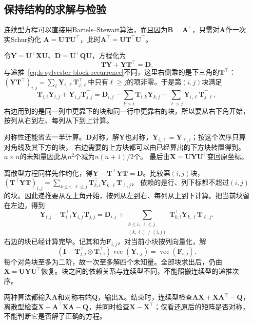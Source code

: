 \subsection{保持结构的求解与检验}
\label{sec:ls-lyapunov-solve}

连续型方程可以直接用Bartels--Stewart算法，而且因为$\bm B=\bm A^\top$，只需对$\bm A$作一次实Schur约化
$\bm A=\bm U\bm T\bm U^\top$，此时$\bm A^\top=\bm U\bm T^\top\bm U^\top$。

令$\bm Y=\bm U^\top\bm X\bm U$、$\bm D=\bm U^\top\bm Q\bm U$，方程化为
\[
 \bm T\bm Y+\bm Y\bm T^\top=\bm D .
\]
与递推~\eqref{eq:ls-sylvester-block-recurrence}不同，这里右侧乘的是下三角的$\bm T^\top$：
$(\bm Y\bm T^\top)_{i,j}=\sum_\ell\bm Y_{i,\ell}\bm T_{j,\ell}^\top$中只有$\ell\geq j$的项非零。于是第$(i,j)$块满足
\[
 \bm T_{i,i}\bm Y_{i,j}+\bm Y_{i,j}\bm T_{j,j}^\top
 =\bm D_{i,j}-\sum_{k>i}\bm T_{i,k}\bm Y_{k,j}-\sum_{\ell>j}\bm Y_{i,\ell}\bm T_{j,\ell}^\top ,
\]
右边用到的是同一列中更靠下的块和同一行中更靠右的块，所以要从右下角开始，按列从右到左、每列从下到上计算。

对称性还能省去一半计算。$\bm D$对称，解$\bm Y$也对称，$\bm Y_{i,\ell}=\bm Y_{\ell,i}^\top$；按这个次序只算对角线及其下方的块，
右边需要的上方块都可以由已经算出的下方块转置得到。$n\times n$的未知量因此从$n^2$个减为$n(n+1)/2$个。
最后由$\bm X=\bm U\bm Y\bm U^\top$变回原坐标。

离散型方程同样先作约化，得$\bm Y-\bm T^\top\bm Y\bm T=\bm D$。比较第$(i,j)$块，
$(\bm T^\top\bm Y\bm T)_{i,j}=\sum_{k\leq i,\ \ell\leq j}\bm T_{k,i}^\top\bm Y_{k,\ell}\bm T_{\ell,j}$，
依赖的是行、列下标都不超过$(i,j)$的块。因此递推要从左上角开始，按列从左到右、每列从上到下计算。把当前块留在左边，得到
\[
 \bm Y_{i,j}-\bm T_{i,i}^\top\bm Y_{i,j}\bm T_{j,j}
 =\bm D_{i,j}+\sum_{\substack{k\leq i,\ \ell\leq j\\(k,\ell)\ne(i,j)}}
 \bm T_{k,i}^\top\bm Y_{k,\ell}\bm T_{\ell,j}.
\]
右边的块已经计算完毕。记其和为$\bm F_{i,j}$，对当前小块按列向量化，解
\[
 (\bm I-\bm T_{j,j}^\top\otimes\bm T_{i,i}^\top)
 \operatorname{vec}(\bm Y_{i,j})=\operatorname{vec}(\bm F_{i,j}).
\]
每个对角块至多为二阶，故一次至多解四个未知量。全部块求出后，仍由$\bm X=\bm U\bm Y\bm U^\top$恢复。块之间的依赖关系与连续型不同，不能照搬连续型的递推次序。

两种算法都输入$\bm A$和对称右端$\bm Q$，输出$\bm X$。结束时，连续型检查$\bm A\bm X+\bm X\bm A^\top-\bm Q$，离散型检查$\bm X-\bm A^\top\bm X\bm A-\bm Q$，并同时检查$\bm X-\bm X^\top$；仅看还原后的矩阵是否对称，不能判断它是否解了正确的方程。


